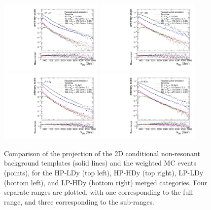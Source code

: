 \begin{figure}[htbp]
  \centering
  \includegraphics[width=0.45\textwidth]{fig/2Dfit/templateVsReco_nonResCond_MVV_e_HP_nobb_LDy.pdf}
  \includegraphics[width=0.45\textwidth]{fig/2Dfit/templateVsReco_nonResCond_MVV_e_HP_nobb_HDy.pdf}\\
  \includegraphics[width=0.45\textwidth]{fig/2Dfit/templateVsReco_nonResCond_MVV_e_LP_nobb_LDy.pdf}
  \includegraphics[width=0.45\textwidth]{fig/2Dfit/templateVsReco_nonResCond_MVV_e_LP_nobb_HDy.pdf}\\
  \caption{
    Comparison of the \MVV projection of the 2D conditional non-resonant background templates (solid lines) and the weighted MC events (points), for the HP-LDy (top left), HP-HDy (top right), LP-LDy (bottom left), and LP-HDy (bottom right) merged categories.
    Four separate \MJ ranges are plotted, with one corresponding to the full \MJ range, and three corresponding to the sub-ranges.
  }
  \label{fig:condTemplateVscondReco_nonRes_MVV_Run2}
\end{figure}

